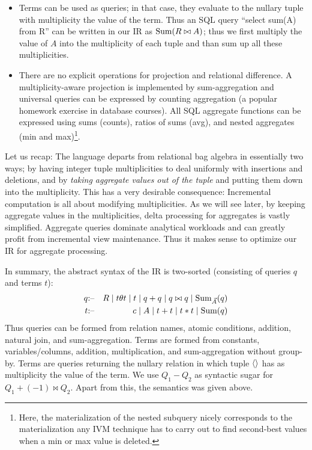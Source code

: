 \begin{itemize}
\item
Terms can be used as queries; in that case, they evaluate to the nullary tuple with multiplicity the value of the term.
Thus an SQL query ``select sum(A) from R'' can be written in our IR as $\mbox{Sum}(R \bowtie A)$; thus we first multiply the value of $A$ into the multiplicity of each tuple and than sum up all these multiplicities.

\item
There are no explicit operations for projection and relational difference. A multiplicity-aware projection is implemented by
sum-aggregation and universal queries can be expressed by counting aggregation (a popular homework exercise in database courses). All SQL aggregate functions can be expressed using sums (counts), ratios of sums (avg),
and nested aggregates (min and max)\footnote{Here, the materialization of the nested subquery
nicely corresponds to the materialization any IVM technique has to carry out to find second-best values when a min or max value is deleted.}.
\end{itemize}

Let us recap: The language departs from relational bag algebra in essentially two ways; by having integer tuple multiplicities
to deal uniformly with insertions and deletions, and by {\em taking aggregate values out of the tuple} and putting them down into
the multiplicity. This has a very desirable consequence: Incremental computation is all about modifying multiplicities.
As we will see later, by keeping aggregate values in the multiplicities, delta processing for aggregates is vastly simplified.
Aggregate queries dominate analytical workloads and can greatly profit from incremental view maintenance. Thus it makes sense to optimize our IR for aggregate processing.




In summary, the abstract syntax of the IR is two-sorted (consisting of queries $q$ and terms $t$):
%
\begin{eqnarray*}
q &\mbox{:--}& R \mid t \theta t \mid t \mid q + q \mid q \bowtie q \mid \mbox{Sum}_{\vec{A}}(q) \\
t &\mbox{:--}& c \mid A                 \mid t + t \mid t * t       \mid \mbox{Sum}(q)
\end{eqnarray*}
Thus queries can be formed from relation names, atomic conditions, addition, natural join, and sum-aggregation.
Terms are formed from constants, variables/columns, addition, multiplication, and sum-aggregation without group-by.
Terms are queries returning the nullary relation in which
tuple ${\langle\rangle}$ has as multiplicity the value of the term. We use $Q_1 - Q_2$ as syntactic sugar for $Q_1 + (-1)\bowtie Q_2$.
Apart from this, the semantics was given above.


